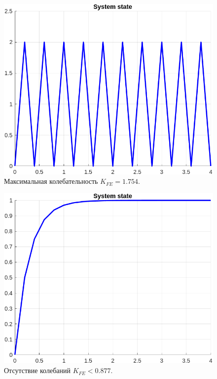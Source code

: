 \documentclass[a4paper, 14pt]{extarticle}
\theoremstyle{definition}
\theoremstyle{plain}
\theoremstyle{remark}
\begin{document}
\begin{figure}
    [H]
    \centering
    \includegraphics[width=350pt]{images/task1_d__max_state.png}
    \caption{Максимальная колебательность $K_{FE}=1.754$.}
\end{figure}
\begin{figure}
    [H]
    \centering
    \includegraphics[width=350pt]{images/task1_d__no_state.png}
    \caption{Отсутствие колебаний $K_{FE}<0.877$.}
\end{figure}
\end{document}
